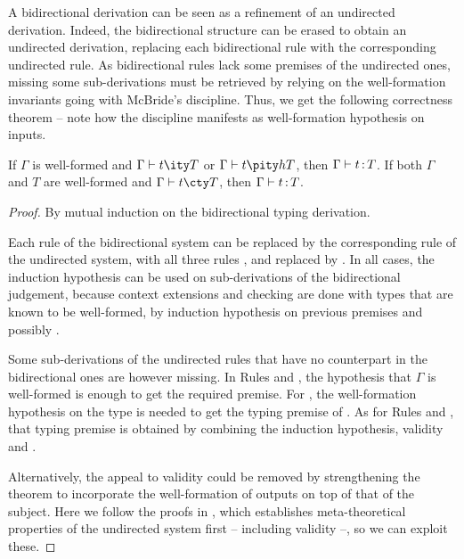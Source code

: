 A bidirectional derivation can be seen as a refinement of an undirected derivation.
Indeed, the bidirectional structure can be erased to obtain an undirected derivation, 
replacing each bidirectional rule with the corresponding undirected rule.
As bidirectional rules lack some premises of the undirected ones, missing some sub-derivations
must be retrieved by relying on the well-formation invariants going with McBride’s discipline.
Thus, we get the following correctness theorem – note how the
discipline manifests as well-formation hypothesis on inputs.

\begin{minipage}{\textwidth}
\begin{theorem}
  \label{thm:corr-ccomega}
  If $\Gamma$ is well-formed and $\inferty{\Gamma}{t}{T}$ or $\pinferty{h}{\Gamma}{t}{T}$,
  then $\Gamma \vdash t \operatorname{\mathrel{:}} T$.
  If both $\Gamma$ and $T$ are well-formed and
  $\checkty{\Gamma}{t}{T}$, then $\Gamma \vdash t \operatorname{\mathrel{:}} T$. 
\end{theorem}  
\end{minipage}

  
\begin{minipage}{\textwidth}
\begin{proof}
  By mutual induction on the bidirectional typing derivation.

  Each rule of the bidirectional system can be replaced by the corresponding rule of the
  undirected system, with all three rules ,  and  replaced by
  . In all cases, the induction hypothesis can be used on sub-derivations of the bidirectional judgement, because context extensions and checking are
  done with types that are known to be well-formed,%
  by induction hypothesis on previous premises and possibly .

  Some sub-derivations of the undirected rules that have no counterpart
  in the bidirectional ones are however missing.
  In Rules  and ,
  the hypothesis that $\Gamma$ is well-formed is enough to get the required premise.
  For ,
  the well-formation hypothesis on the type is needed to get the typing premise of
  .
  As for Rules  and ,
  that typing premise is obtained by combining the induction hypothesis,
  validity and .

  Alternatively, the appeal to validity could be removed by
  strengthening the theorem to incorporate the well-formation of outputs on top of that of
  the subject. Here we follow the proofs in , which establishes
  meta-theoretical properties of the undirected system first – including validity –,
  so we can exploit these.
\end{proof}
\end{minipage}

